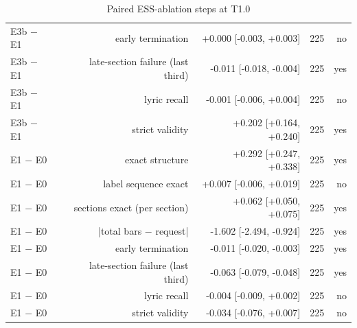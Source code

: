 \begin{table}[t]
\begin{tabular}{lrrrr}
E3b $-$ E1 & early termination & +0.000 [-0.003, +0.003] & 225 & no \\
E3b $-$ E1 & late-section failure (last third) & -0.011 [-0.018, -0.004] & 225 & yes \\
E3b $-$ E1 & lyric recall & -0.001 [-0.006, +0.004] & 225 & no \\
E3b $-$ E1 & strict validity & +0.202 [+0.164, +0.240] & 225 & yes \\
E1 $-$ E0 & exact structure & +0.292 [+0.247, +0.338] & 225 & yes \\
E1 $-$ E0 & label sequence exact & +0.007 [-0.006, +0.019] & 225 & no \\
E1 $-$ E0 & sections exact (per section) & +0.062 [+0.050, +0.075] & 225 & yes \\
E1 $-$ E0 & |total bars $-$ request| & -1.602 [-2.494, -0.924] & 225 & yes \\
E1 $-$ E0 & early termination & -0.011 [-0.020, -0.003] & 225 & yes \\
E1 $-$ E0 & late-section failure (last third) & -0.063 [-0.079, -0.048] & 225 & yes \\
E1 $-$ E0 & lyric recall & -0.004 [-0.009, +0.002] & 225 & no \\
E1 $-$ E0 & strict validity & -0.034 [-0.076, +0.007] & 225 & no \\
\bottomrule
\end{tabular}
\caption{Paired ESS-ablation steps at T1.0}
\label{tab:ess_ablation_deltas_T10}
\end{table}
